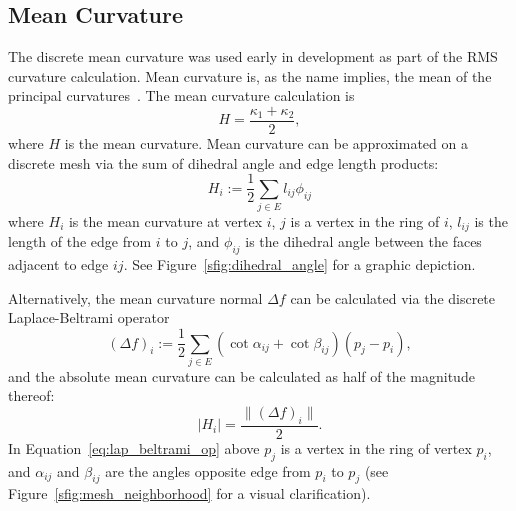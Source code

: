 \subsection{Mean Curvature}\label{sec:mean_k}
The discrete mean curvature was used early in development as part of the RMS curvature calculation.
Mean curvature is, as the name implies, the mean of the principal curvatures~\cite{DDGAppIntro_19_discrete_k_2}.
The mean curvature calculation is
\begin{equation*}%
	H = \frac{\kappa_1 + \kappa_2}{2},
\end{equation*}
where $H$ is the mean curvature.
Mean curvature can be approximated on a discrete mesh via the sum of dihedral angle and edge length products:
\begin{equation}\label{eq:dihedral_angle}
	H_i := \frac{1}{2}\sum_{j \in E}l_{ij} \phi_{ij}
\end{equation}
where $H_i$ is the mean curvature at vertex $i$, $j$ is a vertex in the ring of $i$, $l_{ij}$ is the length of the edge from $i$ to $j$, and $\phi_{ij}$ is the dihedral angle between the faces adjacent to edge $ij$.
See Figure~\ref{sfig:dihedral_angle} for a graphic depiction.

Alternatively, the mean curvature normal $\Delta f$ can be calculated via the discrete Laplace-Beltrami operator~\cite{DDGAppIntro_18_discrete_k_1}
\begin{equation}\label{eq:lap_beltrami_op}
	(\Delta f)_i := \frac{1}{2}\sum_{j \in E}(\cot \alpha_{ij} + \cot \beta_{ij})(p_j - p_i),
\end{equation}
and the absolute mean curvature can be calculated as half of the magnitude thereof:
\begin{equation*}
	|H_i| = \frac{\|(\Delta f)_i \|}{2}.
\end{equation*}
In Equation~\ref{eq:lap_beltrami_op} above $p_j$ is a vertex in the ring of vertex $p_i$, and $\alpha_{ij}$ and $\beta_{ij}$ are the angles opposite edge from $p_i$ to $p_j$ (see Figure~\ref{sfig:mesh_neighborhood} for a visual clarification).

